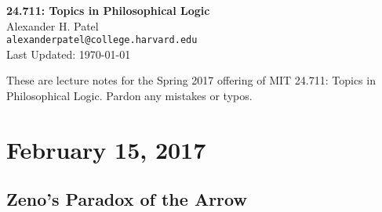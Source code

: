 \documentclass[12pt]{article}
\theoremstyle{definition}
\begin{document}
\begin{center}
\textbf{24.711: Topics in Philosophical Logic} \\
Alexander H. Patel \\
{\tt alexanderpatel@college.harvard.edu} \\
Last Updated: \today
\end{center}

These are lecture notes for the Spring 2017 offering of MIT 24.711: Topics in
Philosophical Logic. Pardon any mistakes or typos.

\tableofcontents

\section{February 15, 2017}

\subsection{Zeno's Paradox of the Arrow}
\end{document}

